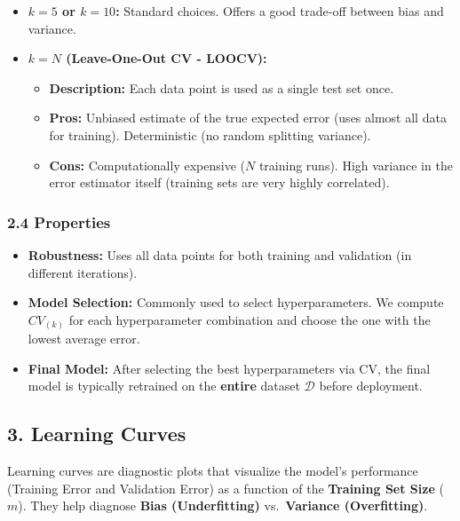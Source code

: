 \documentclass[
  italian,
  11pt,
]{article}
\begin{document}
\begin{itemize}
\item
  \textbf{\(k=5\) or \(k=10\):} Standard choices. Offers a good
  trade-off between bias and variance.
\item
  \textbf{\(k=N\) (Leave-One-Out CV - LOOCV):}

  \begin{itemize}
  \item
    \textbf{Description:} Each data point is used as a single test set
    once.
  \item
    \textbf{Pros:} Unbiased estimate of the true expected error (uses
    almost all data for training). Deterministic (no random splitting
    variance).
  \item
    \textbf{Cons:} Computationally expensive (\(N\) training runs). High
    variance in the error estimator itself (training sets are very
    highly correlated).
  \end{itemize}
\end{itemize}

\subsubsection{2.4 Properties}\label{properties-1}

\begin{itemize}
\item
  \textbf{Robustness:} Uses all data points for both training and
  validation (in different iterations).
\item
  \textbf{Model Selection:} Commonly used to select hyperparameters. We
  compute \(CV_{(k)}\) for each hyperparameter combination and choose
  the one with the lowest average error.
\item
  \textbf{Final Model:} After selecting the best hyperparameters via CV,
  the final model is typically retrained on the \textbf{entire} dataset
  \(\mathcal{D}\) before deployment.
\end{itemize}

\subsection{3. Learning Curves}\label{learning-curves}

Learning curves are diagnostic plots that visualize the model's
performance (Training Error and Validation Error) as a function of the
\textbf{Training Set Size} (\(m\)). They help diagnose \textbf{Bias
(Underfitting)} vs.~\textbf{Variance (Overfitting)}.
\end{document}
